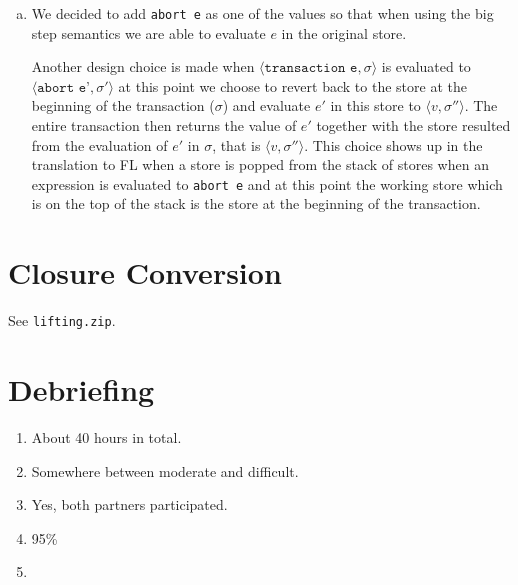 \documentclass[10pt]{article}
\begin{document}
\begin{enumerate} [(a)]
    Let $\llbracket \cdot \rrbracket_1$ be the translation from FL! to FL. We will define $\llbracket \cdot \rrbracket$, the translation from the extended language to FL. Denote $\overline{\sigma}$ as a list of stores so $\# 1 \overline{\sigma}$ returns the head of the list and $\# 2 \overline{\sigma}$ is the tail.
    \begin{align*}
    \llbracket \texttt{transaction e}\rrbracket~\rho~\overline{\sigma} &\triangleq \llbracket e\rrbracket~\rho~(\#1 \overline{\sigma}, \overline{\sigma})\\
    \llbracket \texttt{abort e}\rrbracket~\rho~\overline{\sigma} &\triangleq \llbracket e\rrbracket~\rho~(\#2 \overline{\sigma})\\
    \text{For other expressions }&\text{that are not transaction nor abort:}\\
    \llbracket e\rrbracket~\rho~\overline{\sigma} &\triangleq \texttt{let (x,y) = }\llbracket e\rrbracket_1~\rho~(\#1 \overline{\sigma}) \texttt{ in } (x, (y, \# 2 \overline{\sigma}))
    \end{align*}
    The idea is that when evaluating \texttt{transaction e} we will push the current store onto the top of the list and continue evaluating $e$ in the current store. For \texttt{abort e} we will remove the first store in the list and $e$ will be evaluated in the next store since this is the store of the latest transaction.
    \item We decided to add \texttt{abort e} as one of the values so that when using the big step semantics we are able to evaluate $e$ in the original store.

    Another design choice is made when $\langle \texttt{transaction e}, \sigma \rangle$ is evaluated to $\langle \texttt{abort e'}, \sigma' \rangle$ at this point we choose to revert back to the store at the beginning of the transaction ($\sigma$) and evaluate $e'$ in this store to $\langle v, \sigma'' \rangle$. The entire transaction then returns the value of $e'$ together with the store resulted from the evaluation of $e'$ in $\sigma$, that is $\langle v, \sigma'' \rangle$. This choice shows up in the translation to FL when a store is popped from the stack of stores when an expression is evaluated to \texttt{abort e} and at this point the working store which is on the top of the stack is the store at the beginning of the transaction.
    \end{enumerate}
\section{Closure Conversion}%
See \texttt{lifting.zip}.
\section{Debriefing}%
\begin{enumerate}
    \item About 40 hours in total.
    \item Somewhere between moderate and difficult.
    \item Yes, both partners participated.
    \item 95\%
    \item
\end{enumerate}
\end{document}
